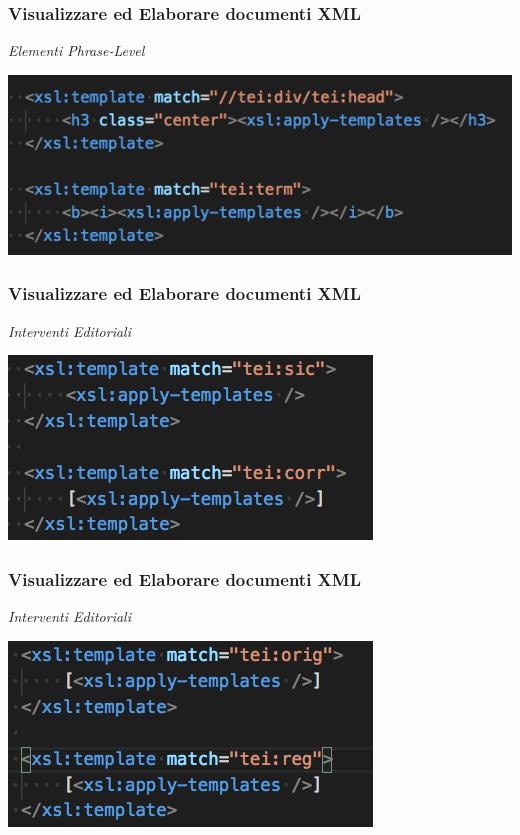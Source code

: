 \begin{frame}
    \frametitle{Visualizzare ed Elaborare documenti XML}
    \addtocounter{nframe}{1}
    
        \textit{Elementi Phrase-Level}

    \begin{center}
        \includegraphics[width=.95\textwidth]{imgs/EsempioCommentato7.png}
    \end{center}

\end{frame}


\begin{frame}
    \frametitle{Visualizzare ed Elaborare documenti XML}
    \addtocounter{nframe}{1}
    
        \textit{Interventi Editoriali}

    \begin{center}
        \includegraphics[width=.8\textwidth]{imgs/EsempioCommentato8a.png}
    \end{center}

\end{frame}

\begin{frame}
    \frametitle{Visualizzare ed Elaborare documenti XML}
    \addtocounter{nframe}{1}
    
        \textit{Interventi Editoriali}

    \begin{center}
        \includegraphics[width=.8\textwidth]{imgs/EsempioCommentato8b.png}
    \end{center}

\end{frame}

